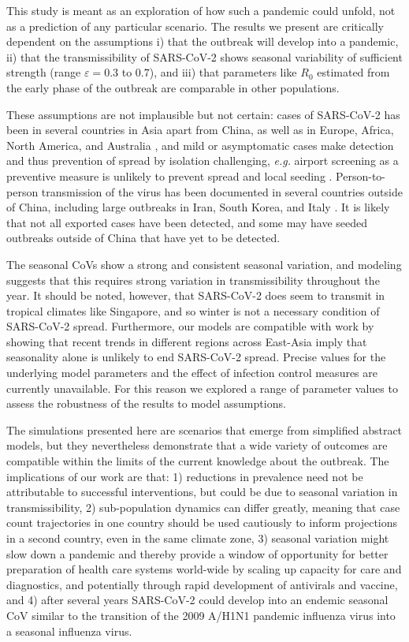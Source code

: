 \documentclass[rmp, reprint, superscriptaddress, floatfix,amsmath]{revtex4-1}
\newcommand{\forcing}{\varepsilon}
\begin{document}
This study is meant as an exploration of how such a pandemic could unfold, not as a prediction of any particular scenario.
The results we present are critically dependent on the assumptions
i) that the outbreak will develop into a pandemic,
ii) that the transmissibility of SARS-CoV-2 shows seasonal variability of sufficient strength (range $\forcing=0.3$ to $0.7$), and
iii) that parameters like $R_0$ estimated from the early phase of the outbreak are comparable in other populations.

These assumptions are not implausible but not certain: cases of SARS-CoV-2 has been in several countries in Asia apart from China, as well as in Europe, Africa, North America, and Australia \citep{WHO_situation_report50}, and mild or asymptomatic cases make detection and thus prevention of spread by isolation challenging, \textit{e.g.} airport screening as a preventive measure is unlikely to prevent spread and local seeding \citep{quilty2020effectiveness}.
Person-to-person transmission of the virus has been documented in several countries outside of China, including large outbreaks in Iran, South Korea, and Italy \citep{WHO_situation_report50}.
It is likely that not all exported cases have been detected, and some may have seeded outbreaks outside of China that have yet to be detected.

The seasonal CoVs show a strong and consistent seasonal variation, and modeling suggests that this requires strong variation in transmissibility throughout the year.
It should be noted, however, that SARS-CoV-2 does seem to transmit in tropical climates like Singapore, and so winter is not a necessary condition of SARS-CoV-2 spread.
Furthermore, our models are compatible with work by \citet{luo_role_2020} showing that recent trends in different regions across East-Asia imply that seasonality alone is unlikely to end SARS-CoV-2 spread.
Precise values for the underlying model parameters and the effect of infection control measures are currently unavailable. For this reason we explored a range of parameter values to assess the robustness of the results to model assumptions.

The simulations presented here are scenarios that emerge from simplified abstract models, but they nevertheless demonstrate that a wide variety of outcomes are compatible within the limits of the current knowledge about the outbreak.
The implications of our work are that: 1) reductions in prevalence need not be attributable to successful interventions, but could be due to seasonal variation in transmissibility, 2) sub-population dynamics can differ greatly, meaning that case count trajectories in one country should be used cautiously to inform projections in a second country, even in the same climate zone, 3) seasonal variation might slow down a pandemic and thereby provide a window of opportunity for better preparation of health care systems world-wide by scaling up capacity for care and diagnostics, and potentially through rapid development of antivirals and vaccine, and 4) after several years SARS-CoV-2 could develop into an endemic seasonal CoV similar to the transition of the 2009 A/H1N1 pandemic influenza virus into a seasonal influenza virus.
\end{document}
